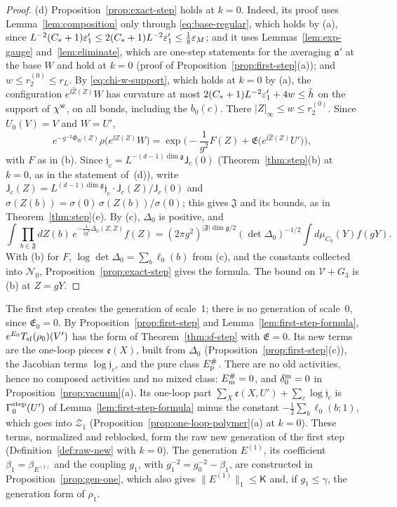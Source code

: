 \begin{proof}
(d) Proposition~\ref{prop:exact-step} holds at $k=0$. Indeed, its proof uses Lemma~\ref{lem:composition} only through \eqref{eq:base-regular}, which holds by (a), since $L^{-2}(C_*+1)\varepsilon'_1\le2(C_*+1)L^{-2}\varepsilon'_1\le\frac18\varepsilon_M$; and it uses Lemmas~\ref{lem:exp-gauge} and~\ref{lem:eliminate}, which are one-step statements for the averaging $\mathfrak a'$ at the base $W$ and hold at $k=0$ (proof of Proposition~\ref{prop:first-step}(a)); and $w\le r^{(0)}_2\le r_L$. By \eqref{eq:chi-w-support}, which holds at $k=0$ by (a), the configuration $e^{\ii\hat Z(Z)}W$ has curvature at most $2(C_*+1)L^{-2}\varepsilon'_1+4w\le\tilde h$ on the support of $\chi^{\rm w}$, on all bonds, including the $b_0(c)$. There $|Z|_\infty\le w\le r^{(0)}_2$. Since $U_0(V)=V$ and $W=U'$,
\[
e^{-g^{-2}\Phi_W(Z)}\rho\big(e^{\ii\hat Z(Z)}W\big)=\exp\Big(-\frac1{g^2}F(Z)+\mathfrak E\big(e^{\ii\hat Z(Z)}U'\big)\Big),
\]
with $F$ as in (b). Since $\mathfrak j_c=L^{-(d-1)\dim\mathfrak g}\mathsf J_c(0)$ (Theorem~\ref{thm:step}(b) at $k=0$, as in the statement of~(d)), write $\mathsf J_c(Z)=L^{(d-1)\dim\mathfrak g}\mathfrak j_c\cdot\mathsf J_c(Z)/\mathsf J_c(0)$ and $\sigma(Z(b))=\sigma(0)\,\sigma(Z(b))/\sigma(0)$; this gives $\mathfrak J$ and its bounds, as in Theorem~\ref{thm:step}(e). By (c), $\Delta_0$ is positive, and
\[
\int\prod_{b\in\mathfrak F}dZ(b)\,e^{-\frac1{2g^2}\Delta_0(Z,Z)}f(Z)=(2\pi g^2)^{|\mathfrak F|\dim\mathfrak g/2}(\det\Delta_0)^{-1/2}\int d\mu_{C_0}(Y)f(gY).
\]
With (b) for $F$, $\log\det\Delta_0=\sum_b\ell_0(b)$ from (c), and the constants collected into $\mathcal N_0$, Proposition~\ref{prop:exact-step} gives the formula. The bound on $\mathcal V+G_3$ is (b) at $Z=gY$.
\end{proof}

\begin{remark}[Generation~1]\label{rem:generation-one}
The first step creates the generation of scale~$1$; there is no generation of scale~$0$, since $\mathfrak E_0=0$. By Proposition~\ref{prop:first-step} and Lemma~\ref{lem:first-step-formula}, $e^{E_0}T_{\rm sf}(\rho_0)(V')$ has the form of Theorem~\ref{thm:sf-step} with $\mathfrak E=0$. Its new terms are the one-loop pieces $\mathfrak e(X)$, built from $\Delta_0$ (Proposition~\ref{prop:first-step}(c)), the Jacobian terms $\log\mathfrak j_c$, and the pure class $E^\#_{\rm p}$. There are no old activities, hence no composed activities and no mixed class: $E^\#_{\rm m}=0$, and $\delta^{\rm m}_0=0$ in Proposition~\ref{prop:vacuum}(a). Its one-loop part $\sum_X\mathfrak e(X,U')+\sum_c\log\mathfrak j_c$ is $\Gamma^{\rm step}_0(U')$ of Lemma~\ref{lem:first-step-formula} minus the constant $-\frac12\sum_b\ell_0(b;1)$, which goes into $\mathcal Z_1$ (Proposition~\ref{prop:one-loop-polymer}(a) at $k=0$). These terms, normalized and reblocked, form the raw new generation of the first step (Definition~\ref{def:raw-new} with $k=0$). The generation $E^{(1)}$, its coefficient $\beta_1=\beta_{E^{(1)}}$ and the coupling $g_1$, with $g_1^{-2}=g_0^{-2}-\beta_1$, are constructed in Proposition~\ref{prop:gen-one}, which also gives $\|E^{(1)}\|_1\le\mathsf K$ and, if $g_1\le\gamma$, the generation form of $\rho_1$.
\end{remark}

